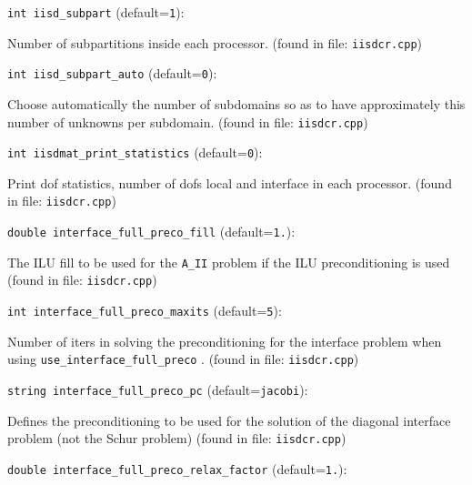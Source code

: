 \item\verb+int iisd_subpart+ {\rm(default=\verb|1|)}:

Number of subpartitions inside each processor. 
 (found in file: \verb+iisdcr.cpp+)
\item\verb+int iisd_subpart_auto+ {\rm(default=\verb|0|)}:

Choose automatically the number of subdomains so as to
have approximately this number of unknowns per subdomain. 
 (found in file: \verb+iisdcr.cpp+)
\item\verb+int iisdmat_print_statistics+ {\rm(default=\verb|0|)}:

Print dof statistics, number of dofs local and interface in each
processor. 
 (found in file: \verb+iisdcr.cpp+)
\item\verb+double interface_full_preco_fill+ {\rm(default=\verb|1.|)}:

The ILU fill to be used for the \verb+A_II+ problem if the
ILU preconditioning is used
 (found in file: \verb+iisdcr.cpp+)
\item\verb+int interface_full_preco_maxits+ {\rm(default=\verb|5|)}:

Number of iters in solving the preconditioning for the 
interface problem when using  \verb+use_interface_full_preco+ . 
 (found in file: \verb+iisdcr.cpp+)
\item\verb+string interface_full_preco_pc+ {\rm(default=\verb|jacobi|)}:

Defines the preconditioning to be used for the solution
of the diagonal interface problem (not the Schur problem)
 (found in file: \verb+iisdcr.cpp+)
\item\verb+double interface_full_preco_relax_factor+ {\rm(default=\verb|1.|)}:

